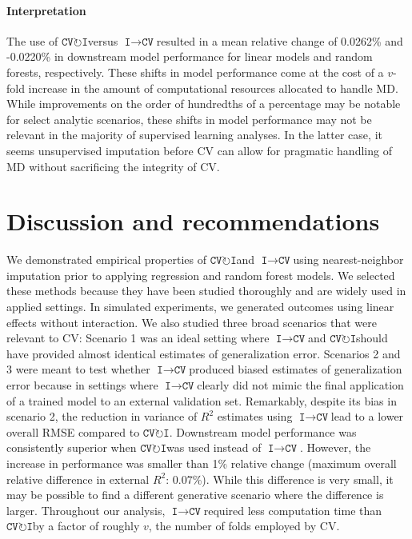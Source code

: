 \documentclass[AMA,STIX1COL,doublespace]{WileyNJD-v2}
\begin{document}
\paragraph{Interpretation}

The use of $\texttt{CV}\!\circlearrowright\!\texttt{I}$\space versus
$\texttt{I}\!\!\rightarrow\!\texttt{CV}$\space resulted in a mean
relative change of 0.0262\% and -0.0220\% in downstream model
performance for linear models and random forests, respectively. These
shifts in model performance come at the cost of a \(v\)-fold increase in
the amount of computational resources allocated to handle MD. While
improvements on the order of hundredths of a percentage may be notable
for select analytic scenarios, these shifts in model performance may not
be relevant in the majority of supervised learning analyses. In the
latter case, it seems unsupervised imputation before CV can allow for
pragmatic handling of MD without sacrificing the integrity of CV.

\section{Discussion and recommendations} \label{sec:discuss}

We demonstrated empirical properties of
$\texttt{CV}\!\circlearrowright\!\texttt{I}$\space and
$\texttt{I}\!\!\rightarrow\!\texttt{CV}$\space using nearest-neighbor
imputation prior to applying regression and random forest models. We
selected these methods because they have been studied thoroughly and are
widely used in applied settings. In simulated experiments, we generated
outcomes using linear effects without interaction. We also studied three
broad scenarios that were relevant to CV: Scenario 1 was an ideal
setting where $\texttt{I}\!\!\rightarrow\!\texttt{CV}$\space and
$\texttt{CV}\!\circlearrowright\!\texttt{I}$\space should have provided
almost identical estimates of generalization error. Scenarios 2 and 3
were meant to test whether
$\texttt{I}\!\!\rightarrow\!\texttt{CV}$\space produced biased estimates
of generalization error because in settings where
$\texttt{I}\!\!\rightarrow\!\texttt{CV}$\space clearly did not mimic the
final application of a trained model to an external validation set.
Remarkably, despite its bias in scenario 2, the reduction in variance of
\(R^2\) estimates using
$\texttt{I}\!\!\rightarrow\!\texttt{CV}$\space lead to a lower overall
RMSE compared to $\texttt{CV}\!\circlearrowright\!\texttt{I}$.
Downstream model performance was consistently superior when
$\texttt{CV}\!\circlearrowright\!\texttt{I}$\space was used instead of
$\texttt{I}\!\!\rightarrow\!\texttt{CV}$. However, the increase in
performance was smaller than 1\% relative change (maximum overall
relative difference in external \(R^2\): 0.07\%). While this difference
is very small, it may be possible to find a different generative
scenario where the difference is larger. Throughout our analysis,
$\texttt{I}\!\!\rightarrow\!\texttt{CV}$\space required less computation
time than $\texttt{CV}\!\circlearrowright\!\texttt{I}$\space by a factor
of roughly \(v\), the number of folds employed by CV.
\end{document}
